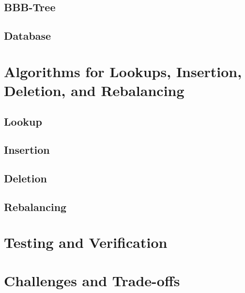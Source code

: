 \subsection*{BBB-Tree}

\subsection*{Database}

\section{Algorithms for Lookups, Insertion, Deletion, and Rebalancing}

\subsection*{Lookup}

\subsection*{Insertion}

\subsection*{Deletion}

\subsection*{Rebalancing}

\section{Testing and Verification}

\section{Challenges and Trade-offs}


